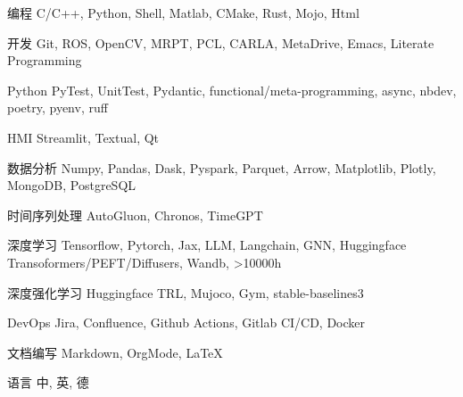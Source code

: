 \documentclass[../cv_cn.tex]{subfiles}
\begin{document}


\begin{cvskills}

  \cvskill
    {编程} %
    {C/C++, Python, Shell, Matlab, CMake, Rust, Mojo, Html} %

  \cvskill
    {开发} %
    {Git, ROS, OpenCV, MRPT, PCL, CARLA, MetaDrive, Emacs, Literate Programming} %

  \cvskill
    {Python} %
    {PyTest, UnitTest, Pydantic, functional/meta-programming, async, nbdev, poetry, pyenv, ruff} %

  \cvskill
    {HMI} %
    {Streamlit, Textual, Qt} %

  \cvskill
    {数据分析} %
    {Numpy, Pandas, Dask, Pyspark, Parquet, Arrow, Matplotlib, Plotly, MongoDB, PostgreSQL} %

  \cvskill
    {时间序列处理} %
    {AutoGluon, Chronos, TimeGPT} %

  \cvskill
    {深度学习} %
    {Tensorflow, Pytorch, Jax, LLM, Langchain, GNN, Huggingface Transoformers/PEFT/Diffusers, Wandb, >10000h} %

  \cvskill
    {深度强化学习} %
    {Huggingface TRL, Mujoco, Gym, stable-baselines3} %


  \cvskill
    {DevOps} %
    {Jira, Confluence, Github Actions, Gitlab CI/CD, Docker} %

  \cvskill
    {文档编写} %
    {Markdown, OrgMode, LaTeX} %

  \cvskill
    {语言} %
    {中, 英, 德} %

\end{cvskills}
\end{document}
